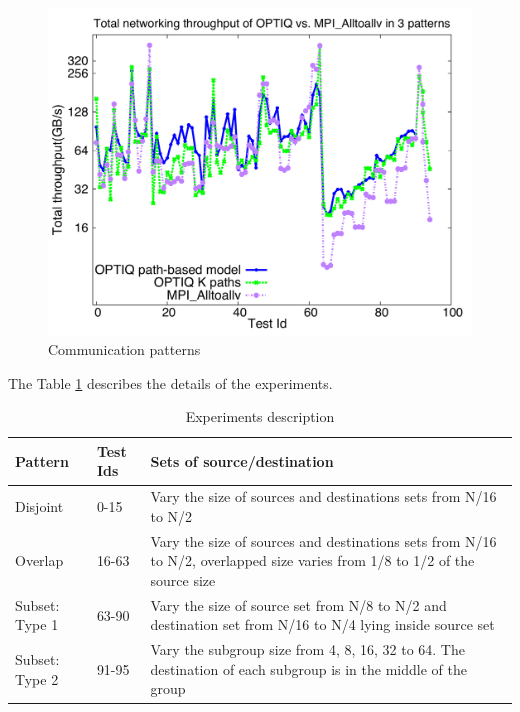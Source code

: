 \begin{figure}[!htb]
\vspace{-0.1in}
\centering
\includegraphics[scale=0.30]{figures/96tests_512.pdf}
\vspace{-0.1in}
\caption{Communication patterns}
\vspace{-0.1in}
\label{fig:96tests_512}
\end{figure}

The Table \ref{tbl:experiment} describes the details of the experiments.

\begin{table}[h]
\begin{center}
    \begin{tabular}{ | p{1cm} | l | p{5cm} |}
    \hline
    Pattern & Test Ids & Sets of source/destination \\ \hline
    Disjoint & 0-15 & Vary the size of sources and destinations sets from N/16 to N/2 \\ \hline
    Overlap & 16-63 & Vary the size of sources and destinations sets from N/16 to N/2, overlapped size varies from 1/8 to 1/2 of the source size \\ \hline
    Subset: Type 1 & 63-90 & Vary the size of source set from N/8 to N/2 and destination set from N/16 to N/4 lying inside source set \\ \hline
    Subset: Type 2 & 91-95 & Vary the subgroup size from 4, 8, 16, 32 to 64. The destination of each subgroup is in the middle of the group \\
    \hline
    \end{tabular}

    \caption{Experiments description}
    \label{tbl:experiment}

\end{center}
\end{table}

